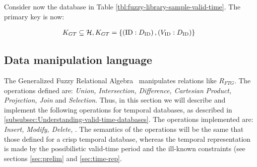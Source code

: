 Consider now the database in Table \ref{tbl:fuzzy-library-sample-valid-time}. The primary key is now:

\begin{align}
 \nonumber
K_{GT} \subseteq \mathcal{H}, K_{GT} = \left \lbrace  \left(\text{ID}:D_{\text{ID}} \right) , \left(V_{\text{ID}}:D_{\text{ID}} \right) \right \rbrace	
\end{align}


\subsection{\label{subsec:data-manipulation}Data manipulation language}

The Generalized Fuzzy Relational Algebra~\cite{Medina1994} manipulates relations like $R_{FTG}$. The operations defined are: \emph{Union, Intersection, Difference, Cartesian Product, Projection, Join} and \emph{Selection}. Thus, in this section we will describe and implement the following operations for temporal databases, as described in \ref{subsubsec:Understanding-valid-time-databases}. The operations implemented are: \emph{Insert, Modify, Delete, }. The semantics of the operations will be the same that those defined for a crisp temporal database, whereas the temporal representation is made by the possibilistic valid-time period and the ill-known constraints (see sections \ref{sec:prelim} and \ref{sec:time-rep}.

